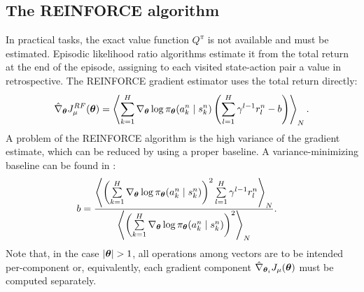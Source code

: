 \subsection{The REINFORCE algorithm}
In practical tasks, the exact value function $Q^{\pi}$ is not available and must be estimated. Episodic likelihood ratio algorithms estimate it from the total return at the end of the episode, assigning to each visited state-action pair a value in retrospective. The REINFORCE gradient estimator \cite{Williams1992} uses the total return directly:
\[
	\hat{\nabla}_{\boldsymbol{\theta}}J_{\mu}^{RF}(\boldsymbol{\theta}) = 
		\left\langle
		\sum\limits_{k=1}^H\nabla_{\boldsymbol{\theta}}\log\pi_{\boldsymbol{\theta}}(a_k^n \mid s_k^n)
		\left(\sum\limits_{l=1}^H\gamma^{l-1}r_l^n-b\right)\right\rangle_N.
\]
A problem of the REINFORCE algorithm is the high variance of the gradient estimate, which can be reduced by using a proper baseline. A variance-minimizing baseline can be found in \cite{Peters2008reinf}:
\begin{align*}
	b &= \frac{\left\langle\left(\sum\limits_{k=1}^H\nabla_{\boldsymbol{\theta}}\log\pi_{\boldsymbol{\theta}}(a_k^n \mid s_k^n)\right)^2
		\sum\limits_{l=1}^H\gamma^{l-1}r_l^n\right\rangle_N}
		{\left\langle\left(\sum\limits_{k=1}^H\nabla_{\boldsymbol{\theta}}\log\pi_{\boldsymbol{\theta}}(a_k^n \mid s_k^n)\right)^2
		\right\rangle_N}.
\end{align*}
Note that, in the case $|\vtheta|>1$, all operations among vectors are to be intended per-component or, equivalently, each gradient component $\hat{\nabla}_{\boldsymbol{\theta}_i}J_{\mu}(\boldsymbol{\theta})$ must be computed separately.

